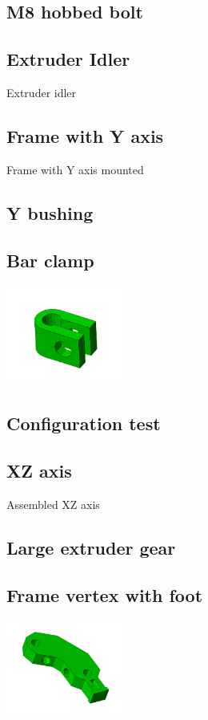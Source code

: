 \documentclass[11pt]{article}
\begin{document}
\hypertarget{thing_hobbed-bolt}{\subsection{M8 hobbed bolt}}

\hypertarget{thing_idler}{\subsection{Extruder Idler}}
Extruder idler

\hypertarget{thing_frame-with-y}{\subsection{Frame with Y axis}}
Frame with Y axis mounted

\hypertarget{thing_y-bushing}{\subsection{Y bushing}}

\hypertarget{thing_bar-clamp}{\subsection{Bar clamp}}
\includegraphics[width=4cm]{images/bar-clamp.jpg}

\hypertarget{thing_calibration}{\subsection{Configuration test}}

\hypertarget{thing_xz-axis}{\subsection{XZ axis}}
Assembled XZ axis

\hypertarget{thing_large-gear}{\subsection{Large extruder gear}}

\hypertarget{thing_frame-vertex-foot}{\subsection{Frame vertex with foot}}
\includegraphics[width=4cm]{images/frame-vertex-foot.jpg}
\end{document}
